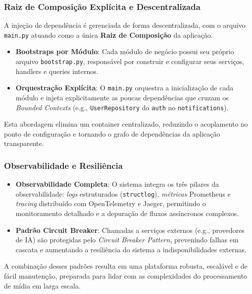 \subsubsection{Raiz de Composição Explícita e Descentralizada}
A injeção de dependência é gerenciada de forma descentralizada, com o arquivo \texttt{main.py} atuando como a única \textbf{Raiz de Composição} da aplicação.
\begin{itemize}
    \item \textbf{Bootstraps por Módulo}: Cada módulo de negócio possui seu próprio arquivo \texttt{bootstrap.py}, responsável por construir e configurar seus serviços, handlers e queries internos.
    \item \textbf{Orquestração Explícita}: O \texttt{main.py} orquestra a inicialização de cada módulo e injeta explicitamente as poucas dependências que cruzam os \textit{Bounded Contexts} (e.g., \texttt{UserRepository} do \texttt{auth} no \texttt{notifications}).
\end{itemize}
Esta abordagem elimina um container centralizado, reduzindo o acoplamento no ponto de configuração e tornando o grafo de dependências da aplicação transparente.

\subsubsection{Observabilidade e Resiliência}
\begin{itemize}
    \item \textbf{Observabilidade Completa}: O sistema integra os três pilares da observabilidade: \textit{logs} estruturados (\texttt{structlog}), \textit{métricas} Prometheus e \textit{tracing} distribuído com OpenTelemetry e Jaeger, permitindo o monitoramento detalhado e a depuração de fluxos assíncronos complexos.
    \item \textbf{Padrão Circuit Breaker}: Chamadas a serviços externos (e.g., provedores de IA) são protegidas pelo \textit{Circuit Breaker Pattern}, prevenindo falhas em cascata e aumentando a resiliência do sistema a indisponibilidades externas.
\end{itemize}
A combinação desses padrões resulta em uma plataforma robusta, escalável e de fácil manutenção, preparada para lidar com as complexidades do processamento de mídia em larga escala.